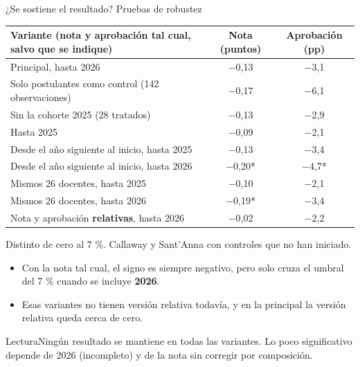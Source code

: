 \documentclass[10pt,aspectratio=169]{beamer}
\newcommand{\sintesis}[2]{%
  \begin{block}{#1}#2\end{block}}
\begin{document}
\begin{frame}{¿Se sostiene el resultado? Pruebas de robustez}
  \begin{table}\scriptsize
    \begin{tabular}{p{6.4cm}cc}
      \toprule
      Variante (nota y aprobación tal cual, salvo que se indique) & Nota (puntos) & Aprobación (pp) \\
      \midrule
      Principal, hasta 2026 & $-$0,13 & $-$3,1 \\
      Solo postulantes como control (142 observaciones) & $-$0,17 & $-$6,1 \\
      Sin la cohorte 2025 (28 tratados) & $-$0,13 & $-$2,9 \\
      Hasta 2025 & $-$0,09 & $-$2,1 \\
      Desde el año siguiente al inicio, hasta 2025 & $-$0,13 & $-$3,4 \\
      Desde el año siguiente al inicio, hasta 2026 & \alert{$-$0,20}* & \alert{$-$4,7}* \\
      Mismos 26 docentes, hasta 2025 & $-$0,10 & $-$2,1 \\
      Mismos 26 docentes, hasta 2026 & \alert{$-$0,19}* & $-$3,4 \\
      \midrule
      Nota y aprobación \textbf{relativas}, hasta 2026 & $-$0,02 & $-$2,2 \\
      \bottomrule
    \end{tabular}
  \end{table}
  {\scriptsize * Distinto de cero al 7 \%. Callaway y Sant'Anna con controles que no han iniciado.}
  \vspace{0.2em}
  \begin{itemize}\small
    \item Con la nota tal cual, el signo es siempre negativo, pero solo cruza el umbral del 7 \% cuando se incluye \textbf{2026}.
    \item Esas variantes no tienen versión relativa todavía, y en la principal la versión relativa queda cerca de cero.
  \end{itemize}
  \sintesis{Lectura}{Ningún resultado se mantiene en todas las variantes. Lo poco significativo depende de 2026 (incompleto) y de la nota sin corregir por composición.}
\end{frame}
\end{document}
